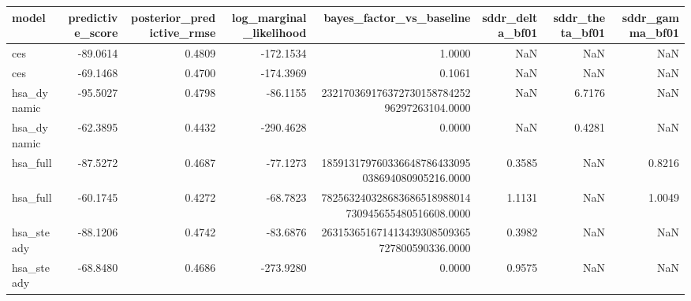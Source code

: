 \begin{tabular}{lrrrrrrr}
\toprule
model & predictive\_score & posterior\_predictive\_rmse & log\_marginal\_likelihood & bayes\_factor\_vs\_baseline & sddr\_delta\_bf01 & sddr\_theta\_bf01 & sddr\_gamma\_bf01 \\
\midrule
ces & -89.0614 & 0.4809 & -172.1534 & 1.0000 & NaN & NaN & NaN \\
ces & -69.1468 & 0.4700 & -174.3969 & 0.1061 & NaN & NaN & NaN \\
hsa\_dynamic & -95.5027 & 0.4798 & -86.1155 & 23217036917637273015878425296297263104.0000 & NaN & 6.7176 & NaN \\
hsa\_dynamic & -62.3895 & 0.4432 & -290.4628 & 0.0000 & NaN & 0.4281 & NaN \\
hsa\_full & -87.5272 & 0.4687 & -77.1273 & 185913179760336648786433095038694080905216.0000 & 0.3585 & NaN & 0.8216 \\
hsa\_full & -60.1745 & 0.4272 & -68.7823 & 782563240328683686518988014730945655480516608.0000 & 1.1131 & NaN & 1.0049 \\
hsa\_steady & -88.1206 & 0.4742 & -83.6876 & 263153651671413439308509365727800590336.0000 & 0.3982 & NaN & NaN \\
hsa\_steady & -68.8480 & 0.4686 & -273.9280 & 0.0000 & 0.9575 & NaN & NaN \\
\bottomrule
\end{tabular}
